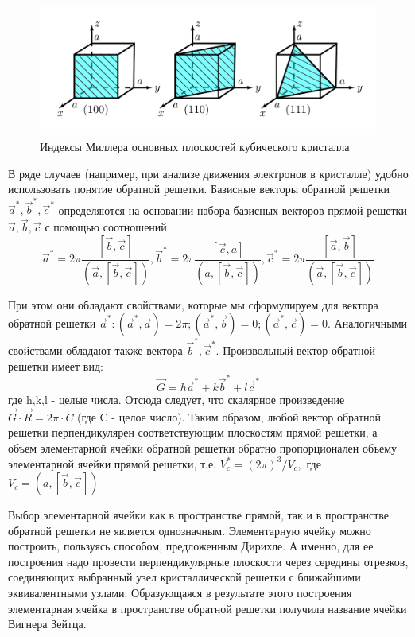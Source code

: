 		\begin{figure}[h!]
			\centering
			\includegraphics[width = .8\linewidth]{img/13}
			\caption{Индексы Миллера основных плоскостей кубического кристалла}
			\label{fig:1.3}
		\end{figure}
		
		В ряде случаев (например, при анализе движения электронов в кристалле) удобно использовать понятие обратной решетки.
		Базисные векторы обратной решетки $\vec{a}^*,\vec{b}^*,\vec{c}^*$ определяются на основании набора базисных векторов
		прямой решетки $\vec{a},\vec{b},\vec{c}$ с помощью соотношений
		\begin{equation}
		\vec{a}^{*}=2 \pi \frac{[\vec{b}, \vec{c}]}{(\vec{a}, [ \vec{b}, \vec{c}])}, \vec{b}^{*}=2 \pi \frac{[\vec{c}, a]}{(a,[\vec{b}, \vec{c}])}, \vec{c}^{*}=2 \pi \frac{[\vec{a}, \vec{b}]}{(\vec{a},[\vec{b}, \vec{c}])}
		\label{eq:1.2}
		\end{equation}
		
		При этом они обладают свойствами, которые мы сформулируем для вектора обратной решетки $\vec{a}^{*} :\left(\vec{a}^{*},
		\vec{a}\right)=2 \pi; \left(\vec{a}^{*}, \vec{b}\right)=0 ;\left(\vec{a}^{*}, \vec{c}\right)=0$. Аналогичными свойствами
		обладают также вектора $\vec{b}^{*},\vec{c}^{*}$.
		Произвольный вектор обратной решетки имеет вид:
		\begin{equation}
		\vec{G}=h \vec{a}^{*}+k \vec{b}^{*}+l \vec{c}^{*}
		\label{eq:1.3}
		\end{equation}
		где h,k,l - целые числа. Отсюда следует, что скалярное произведение $\vec{G} \cdot \vec{R}=2 \pi \cdot C$ (где C - целое
		число). Таким образом, любой вектор обратной решетки перпендикулярен соответствующим плоскостям прямой решетки, а объем
		элементарной ячейки обратной решетки обратно пропорционален объему элементарной ячейки прямой решетки, т.е. $V_{c}^{*}=(2 \pi)^{3}/V_{c},$ где $V_{c}=(a,[\vec{b}, \vec{c}])$
		
		Выбор элементарной ячейки как в пространстве прямой, так и в пространстве обратной решетки не является однозначным.
		Элементарную ячейку можно построить, пользуясь способом, предложенным Дирихле. А именно, для ее построения надо провести
		перпендикулярные плоскости через середины отрезков, соединяющих выбранный узел кристаллической решетки с ближайшими
		эквивалентными узлами. Образующаяся в результате этого построения элементарная ячейка в пространстве обратной решетки
		получила название ячейки Вигнера Зейтца.
		
